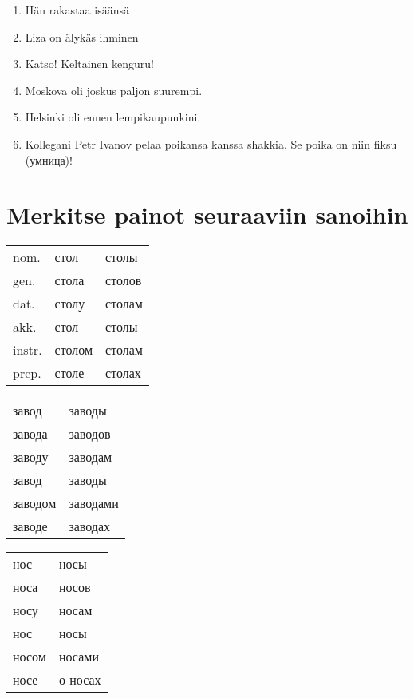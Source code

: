 \documentclass[paper=a4, fontsize=11pt]{scrartcl}
\begin{document}
\begin{enumerate}
    \item Hän rakastaa isäänsä \\
    \underline{\hspace{12cm}}
    \item Liza on älykäs ihminen \\
    \underline{\hspace{12cm}}
    \item Katso! Keltainen kenguru! \\
    \underline{\hspace{12cm}}
    \item Moskova oli joskus paljon suurempi. \\
    \underline{\hspace{12cm}}
    \item Helsinki oli ennen lempikaupunkini. \\
    \underline{\hspace{12cm}}
    \item Kollegani Petr Ivanov pelaa poikansa kanssa shakkia. Se poika on niin fiksu (умница)!  \\
    \underline{\hspace{12cm}}
\end{enumerate}

\section{Merkitse painot seuraaviin sanoihin}

 
\begin{tabular}[c]{lll}
nom. & стол & столы \\
gen. & стола & столов \\
dat. & столу & столам \\
akk. & стол & столы \\
instr. & столом & столам \\
prep. & столе & столах \\
\end{tabular}
\begin{tabular}[c]{|ll}
завод & заводы \\
завода & заводов \\
заводу & заводам \\
завод & заводы \\
заводом & заводами \\
заводе & заводах \\
\end{tabular}
\begin{tabular}[c]{|ll}
нос & носы\\
носа & носов\\
носу & носам\\
нос & носы\\
носом & носами\\
носе & о носах\\ 
\end{tabular}
\end{document}
